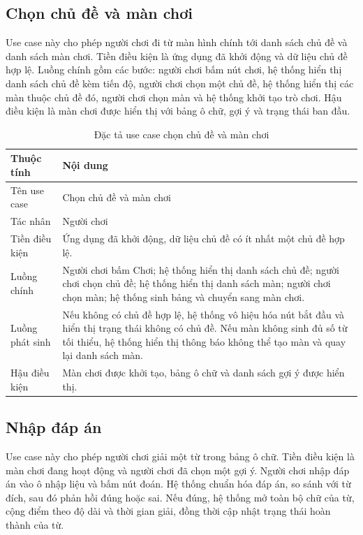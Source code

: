 ﻿\documentclass[../DoAn.tex]{subfiles}
\begin{document}
\subsection{Chọn chủ đề và màn chơi}
Use case này cho phép người chơi đi từ màn hình chính tới danh sách chủ đề và danh sách màn chơi. Tiền điều kiện là ứng dụng đã khởi động và dữ liệu chủ đề hợp lệ. Luồng chính gồm các bước: người chơi bấm nút chơi, hệ thống hiển thị danh sách chủ đề kèm tiến độ, người chơi chọn một chủ đề, hệ thống hiển thị các màn thuộc chủ đề đó, người chơi chọn màn và hệ thống khởi tạo trò chơi. Hậu điều kiện là màn chơi được hiển thị với bảng ô chữ, gợi ý và trạng thái ban đầu.

\begin{table}[H]
\centering
\begin{tabular}{|p{3.2cm}|p{10.8cm}|}
\hline
\textbf{Thuộc tính} & \textbf{Nội dung} \\ \hline
Tên use case & Chọn chủ đề và màn chơi \\ \hline
Tác nhân & Người chơi \\ \hline
Tiền điều kiện & Ứng dụng đã khởi động, dữ liệu chủ đề có ít nhất một chủ đề hợp lệ. \\ \hline
Luồng chính & Người chơi bấm Chơi; hệ thống hiển thị danh sách chủ đề; người chơi chọn chủ đề; hệ thống hiển thị danh sách màn; người chơi chọn màn; hệ thống sinh bảng và chuyển sang màn chơi. \\ \hline
Luồng phát sinh & Nếu không có chủ đề hợp lệ, hệ thống vô hiệu hóa nút bắt đầu và hiển thị trạng thái không có chủ đề. Nếu màn không sinh đủ số từ tối thiểu, hệ thống hiển thị thông báo không thể tạo màn và quay lại danh sách màn. \\ \hline
Hậu điều kiện & Màn chơi được khởi tạo, bảng ô chữ và danh sách gợi ý được hiển thị. \\ \hline
\end{tabular}
\caption{Đặc tả use case chọn chủ đề và màn chơi}
\label{table:uc_select_stage}
\end{table}

\subsection{Nhập đáp án}
Use case này cho phép người chơi giải một từ trong bảng ô chữ. Tiền điều kiện là màn chơi đang hoạt động và người chơi đã chọn một gợi ý. Người chơi nhập đáp án vào ô nhập liệu và bấm nút đoán. Hệ thống chuẩn hóa đáp án, so sánh với từ đích, sau đó phản hồi đúng hoặc sai. Nếu đúng, hệ thống mở toàn bộ chữ của từ, cộng điểm theo độ dài và thời gian giải, đồng thời cập nhật trạng thái hoàn thành của từ.
\end{document}
